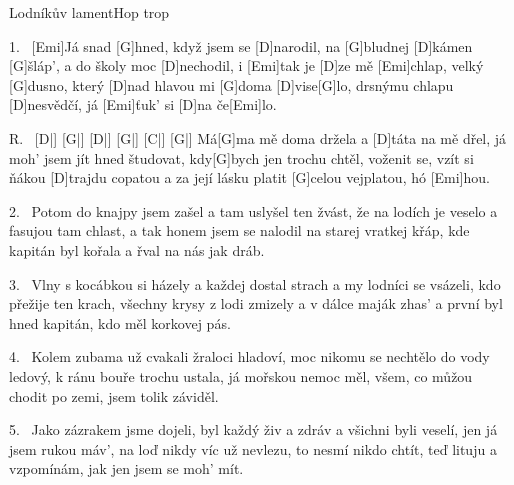 \begin{song}{Lodníkův lament}{Hop trop}

\begin{xverse}{1.~}
[\large Emi]Já snad [\large G]hned, když jsem se [\large D]narodil,
na [\large G]bludnej [\large D]kámen [\large G]{šláp'},
a do školy moc [\large D]nechodil, i [\large Emi]tak je [\large D]ze mě [\large Emi]chlap,
velký [\large G]dusno, který [\large D]nad hlavou mi [\large G]doma [\large D]vise[\large G]lo,
drsnýmu chlapu [\large D]nesvědčí,
já [\large Emi]{ťuk'} si [\large D]na če[\large Emi]lo.
\end{xverse}


\begin{xverse}{R.~}
[\large D|]{} [\large G|]{} [\large D|]{} [\large G|]{} [\large C|]{} [\large G|]{}
Má[\large G]ma mě doma držela a [\large D]táta na mě dřel,
já moh' jsem jít hned študovat, kdy[\large G]bych jen trochu chtěl,
voženit se, vzít si ňákou [\large D]trajdu copatou
a za její lásku platit [\large G]celou vejplatou, hó [\large Emi]hou.
\end{xverse}


\begin{xverse}{2.~}
Potom do knajpy jsem zašel a tam uslyšel ten žvást,
že na lodích je veselo a fasujou tam chlast,
a tak honem jsem se nalodil na starej vratkej křáp,
kde kapitán byl kořala a řval na nás jak dráb.
\end{xverse}


\begin{xverse}{3.~}
Vlny s kocábkou si házely a každej dostal strach
a my lodníci se vsázeli, kdo přežije ten krach,
všechny krysy z lodi zmizely a v dálce maják zhas'
a první byl hned kapitán, kdo měl korkovej pás.
\end{xverse}


\begin{xverse}{4.~}
Kolem zubama už cvakali žraloci hladoví,
moc nikomu se nechtělo do vody ledový,
k ránu bouře trochu ustala, já mořskou nemoc měl,
všem, co můžou chodit po zemi, jsem tolik záviděl.
\end{xverse}

\begin{xverse}{5.~}
Jako zázrakem jsme dojeli, byl každý živ a zdráv
a všichni byli veselí, jen já jsem rukou máv',
na loď nikdy víc už nevlezu, to nesmí nikdo chtít,
teď lituju a vzpomínám, jak jen jsem se moh' mít.
\end{xverse}

\end{song}

